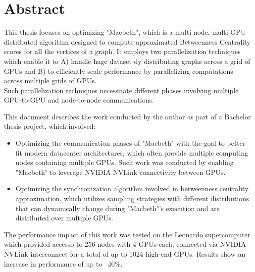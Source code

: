 \chapter*{Abstract}
\label{cha:abtract}
\setlength{\parindent}{0pt}
\setlength{\parskip}{0.5em}


This thesis focuses on optimizing "Macbeth", which is a multi-node, multi-GPU distributed algorithm designed to compute approximated Betweenness Centrality scores for all the vertices of a graph. It employs two parallelization techniques which enable it to A) handle huge dataset dy distributing graphs across a grid of GPUs and B) to efficiently scale performance by parallelizing computations across multiple grids of GPUs.\\
Such parallelization techniques necessitate different phases involving multiple GPU-to-GPU and node-to-node communications.

This document describes the work conducted by the author as part of a Bachelor thesis project, which involved:
\begin{itemize}
	\item Optimizing the communication phases of "Macbeth" with the goal to better fit modern datacenter architectures, which often provide multiple computing nodes containing multiple GPUs. Such work was conducted by enabling "Macbeth" to leverage NVIDIA NVLink connectivity between GPUs. 
	\item Optimizing the synchronization algorithm involved in betweenness centrality approximation, which utilizes sampling strategies with different distributions that can dynamically change during "Macbeth"'s execution and are distributed over multiple GPUs.
\end{itemize}

The performance impact of this work was tested on the Leonardo supercomputer which provided accesso to 256 nodes with 4 GPUs each, connected via NVIDIA NVLink interconnect for a total of up to 1024 high-end GPUs. 
Results show an increase in performance of up to ~40\%.

